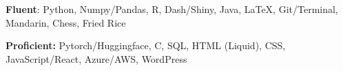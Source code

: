  \textbf{Fluent}: Python, Numpy/Pandas, R, Dash/Shiny, Java, \LaTeX, Git/Terminal, Mandarin, Chess, Fried Rice

 \textbf{Proficient:} Pytorch/Huggingface, C, SQL, HTML (Liquid), CSS, JavaScript/React, Azure/AWS, WordPress
